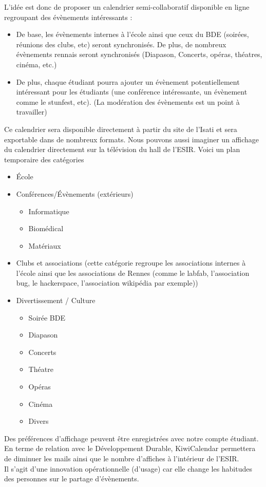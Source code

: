 \documentclass[a4paper,10pt]{article}
\begin{document}
L'idée est donc de proposer un calendrier semi-collaboratif disponible en ligne regroupant des évènements intéressants :
\begin{itemize}
  \item De base, les évènements internes à l'école ainsi que ceux du BDE  (soirées, réunions des clubs, etc) seront synchronisés. De plus, de  nombreux évènements rennais seront synchronisés (Diapason, Concerts,  opéras, théatres, cinéma, etc.)
  \item De plus, chaque étudiant pourra ajouter un évènement potentiellement  intéressant pour les étudiants (une conférence intéressante, un  évènement comme le stunfest, etc). (La modération des évènements est un point à travailler)
\end{itemize}
Ce calendrier sera disponible directement à partir du site de l'Isati et  sera exportable dans de nombreux formats. Nous pouvons aussi imaginer un  affichage du calendrier directement sur la télévision du hall de l'ESIR. 
Voici un plan temporaire des catégories
\begin{itemize}
  \item École
  \item Conférences/Évènements (extérieurs)
  \begin{itemize}
    \item Informatique
    \item Biom\'edical
    \item Mat\'eriaux
  \end{itemize}
  \item Clubs et associations (cette catégorie regroupe les associations  internes à l'école ainsi que les associations de Rennes (comme le  labfab, l'association bug, le hackerspace, l'association wikipédia par  exemple)) 
  \item Divertissement / Culture
  \begin{itemize}
    \item Soirée BDE
    \item Diapason
    \item Concerts 
    \item Théatre 
    \item Opéras 
    \item Cinéma
    \item Divers 
  \end{itemize}

\end{itemize}
Des préférences d'affichage peuvent être enregistrées avec notre compte  étudiant.\\
En terme de relation avec le Développement Durable, KiwiCalendar permettera de diminuer les mails ainsi que le nombre d'affiches à l'intérieur de l'ESIR.\\
Il s'agit d'une innovation opérationnelle (d'usage) car elle change les habitudes des personnes sur le partage d'évènements.
\end{document}

